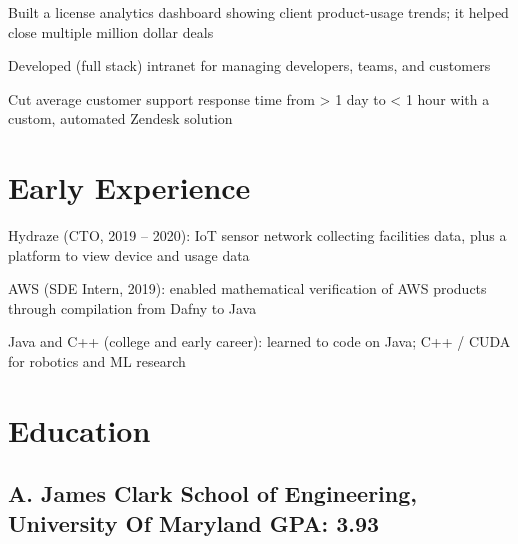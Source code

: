 \documentclass[print]{jack-resume}
\begin{document}
\begin{tightemize}
    \item Built a license analytics dashboard showing client product-usage trends; it helped close multiple million dollar deals
    \item Developed (full stack) intranet for managing developers, teams, and customers
    \item Cut average customer support response time from > 1 day to < 1 hour with a custom, automated Zendesk solution
\end{tightemize}
\sectionsep

\section{Early Experience}
\vspace{1.4em}
\begin{tightemize}
    \item Hydraze (CTO, 2019 -- 2020): IoT sensor network collecting facilities data, plus a platform to view device and usage data
    \item AWS (SDE Intern, 2019): enabled mathematical verification of AWS products through compilation from Dafny to Java
    \item Java and C++ (college and early career): learned to code on Java; C++ / CUDA for robotics and ML research
\end{tightemize}
\sectionsep

\section{Education}
\subsection{A. James Clark School of Engineering, University Of Maryland \hfill GPA: 3.93}

\begin{minipage}[t]{0.04\textwidth}
    \hfill
\end{minipage}
\end{document}
